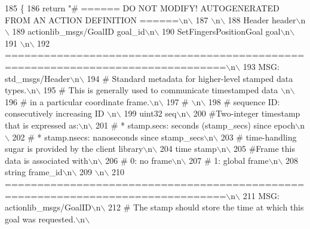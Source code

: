 \begin{DoxyCode}
185   \{
186     \textcolor{keywordflow}{return} \textcolor{stringliteral}{"# ====== DO NOT MODIFY! AUTOGENERATED FROM AN ACTION DEFINITION ======\(\backslash\)n\(\backslash\)}
187 \textcolor{stringliteral}{\(\backslash\)n\(\backslash\)}
188 \textcolor{stringliteral}{Header header\(\backslash\)n\(\backslash\)}
189 \textcolor{stringliteral}{actionlib\_msgs/GoalID goal\_id\(\backslash\)n\(\backslash\)}
190 \textcolor{stringliteral}{SetFingersPositionGoal goal\(\backslash\)n\(\backslash\)}
191 \textcolor{stringliteral}{\(\backslash\)n\(\backslash\)}
192 \textcolor{stringliteral}{================================================================================\(\backslash\)n\(\backslash\)}
193 \textcolor{stringliteral}{MSG: std\_msgs/Header\(\backslash\)n\(\backslash\)}
194 \textcolor{stringliteral}{# Standard metadata for higher-level stamped data types.\(\backslash\)n\(\backslash\)}
195 \textcolor{stringliteral}{# This is generally used to communicate timestamped data \(\backslash\)n\(\backslash\)}
196 \textcolor{stringliteral}{# in a particular coordinate frame.\(\backslash\)n\(\backslash\)}
197 \textcolor{stringliteral}{# \(\backslash\)n\(\backslash\)}
198 \textcolor{stringliteral}{# sequence ID: consecutively increasing ID \(\backslash\)n\(\backslash\)}
199 \textcolor{stringliteral}{uint32 seq\(\backslash\)n\(\backslash\)}
200 \textcolor{stringliteral}{#Two-integer timestamp that is expressed as:\(\backslash\)n\(\backslash\)}
201 \textcolor{stringliteral}{# * stamp.secs: seconds (stamp\_secs) since epoch\(\backslash\)n\(\backslash\)}
202 \textcolor{stringliteral}{# * stamp.nsecs: nanoseconds since stamp\_secs\(\backslash\)n\(\backslash\)}
203 \textcolor{stringliteral}{# time-handling sugar is provided by the client library\(\backslash\)n\(\backslash\)}
204 \textcolor{stringliteral}{time stamp\(\backslash\)n\(\backslash\)}
205 \textcolor{stringliteral}{#Frame this data is associated with\(\backslash\)n\(\backslash\)}
206 \textcolor{stringliteral}{# 0: no frame\(\backslash\)n\(\backslash\)}
207 \textcolor{stringliteral}{# 1: global frame\(\backslash\)n\(\backslash\)}
208 \textcolor{stringliteral}{string frame\_id\(\backslash\)n\(\backslash\)}
209 \textcolor{stringliteral}{\(\backslash\)n\(\backslash\)}
210 \textcolor{stringliteral}{================================================================================\(\backslash\)n\(\backslash\)}
211 \textcolor{stringliteral}{MSG: actionlib\_msgs/GoalID\(\backslash\)n\(\backslash\)}
212 \textcolor{stringliteral}{# The stamp should store the time at which this goal was requested.\(\backslash\)n\(\backslash\)}

\end{DoxyCode}
